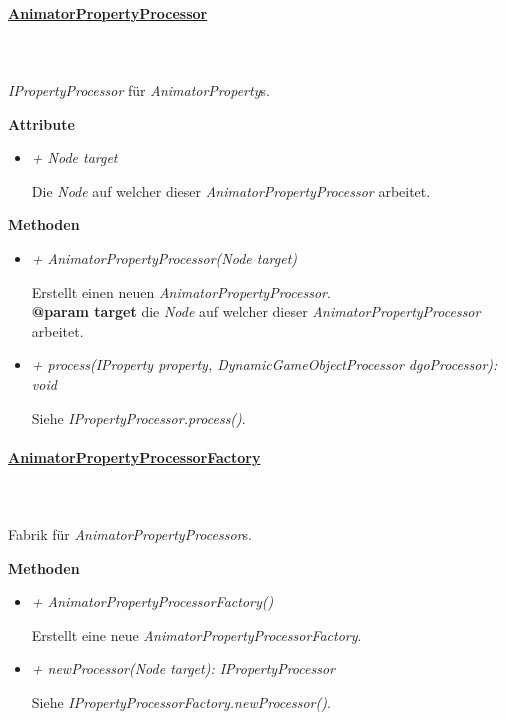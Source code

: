     \paragraph{\underline{AnimatorPropertyProcessor}} \mbox{}\\
    \\
    \textit{IPropertyProcessor} für \textit{AnimatorProperty}s.\par

        \textbf{Attribute}
        \begin{itemize}
            \item \textit{+ Node target}
                \begin{leftbar}[0.9\linewidth]
                    Die \textit{Node} auf welcher dieser \textit{AnimatorPropertyProcessor} arbeitet.
                \end{leftbar}
        \end{itemize}
        \textbf{Methoden}
        \begin{itemize}
            \item \textit{+ AnimatorPropertyProcessor(Node target)}
                \begin{leftbar}[0.9\linewidth]
                    Erstellt einen neuen \textit{AnimatorPropertyProcessor}.\\
                    \textbf{@param target} die \textit{Node} auf welcher dieser \textit{AnimatorPropertyProcessor} arbeitet.
                \end{leftbar}
            \item \textit{+ process(IProperty property, DynamicGameObjectProcessor dgoProcessor): void}
                \begin{leftbar}[0.9\linewidth]
                    Siehe \textit{IPropertyProcessor.process()}.
                \end{leftbar}
        \end{itemize}

    \paragraph{\underline{AnimatorPropertyProcessorFactory}} \mbox{}\\
    \\
    Fabrik für \textit{AnimatorPropertyProcessor}s.\par

        \textbf{Methoden}
        \begin{itemize}
            \item \textit{+ AnimatorPropertyProcessorFactory()}
                \begin{leftbar}[0.9\linewidth]
                    Erstellt eine neue \textit{AnimatorPropertyProcessorFactory}.
                \end{leftbar}
            \item \textit{+ newProcessor(Node target): IPropertyProcessor}
                \begin{leftbar}[0.9\linewidth]
                    Siehe \textit{IPropertyProcessorFactory.newProcessor()}.
                \end{leftbar}
        \end{itemize}

